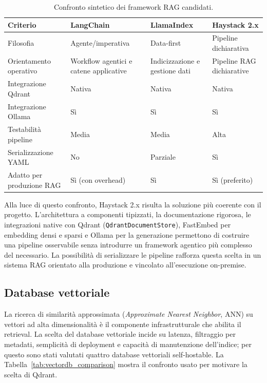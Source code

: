 \begin{table}[ht]
  \centering
  \caption{Confronto sintetico dei framework RAG candidati.}
  \label{tab:framework_comparison}
  \small
  \begin{tabularx}{\textwidth}{L{2.8cm}YYY}
    \toprule
    \textbf{Criterio} & \textbf{LangChain} & \textbf{LlamaIndex} &
      \textbf{Haystack 2.x} \\
    \midrule
    Filosofia & Agente/imperativa & Data-first & Pipeline dichiarativa \\
    Orientamento operativo & Workflow agentici e catene applicative &
      Indicizzazione e gestione dati & Pipeline RAG dichiarative \\
    Integrazione Qdrant & Nativa & Nativa & Nativa \\
    Integrazione Ollama & Sì & Sì & Sì \\
    Testabilità pipeline & Media & Media & Alta \\
    Serializzazione YAML & No & Parziale & Sì \\
    Adatto per produzione RAG & Sì (con overhead) & Sì & Sì (preferito) \\
    \bottomrule
  \end{tabularx}
\end{table}

\noindent Alla luce di questo confronto, Haystack 2.x risulta la soluzione più
coerente con il progetto. L'architettura a componenti tipizzati, la
documentazione rigorosa, le integrazioni native con Qdrant
(\texttt{QdrantDocumentStore}), FastEmbed per embedding densi e sparsi e Ollama
per la generazione permettono di costruire una pipeline osservabile senza
introdurre un framework agentico più complesso del necessario. La possibilità di
serializzare le pipeline rafforza questa scelta in un sistema RAG orientato alla
produzione e vincolato all'esecuzione on-premise.

\subsection{Database vettoriale}
\label{subsec:vectordb_choice}

La ricerca di similarità approssimata (\emph{Approximate Nearest Neighbor},
ANN) su vettori ad alta dimensionalità è il componente infrastrutturale che
abilita il retrieval. La scelta del database vettoriale incide su latenza,
filtraggio per metadati, semplicità di deployment e capacità di manutenzione
dell'indice; per questo sono stati valutati quattro database vettoriali
self-hostable.
La Tabella~\ref{tab:vectordb_comparison} mostra il confronto usato per
motivare la scelta di Qdrant.

